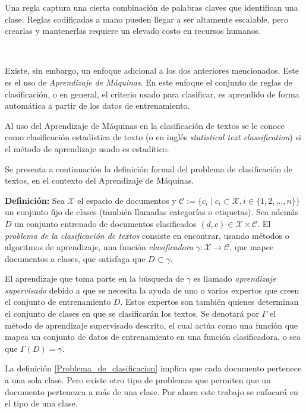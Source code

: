 \documentclass[t,compress,10pt,xcolor=dvipsnames]{beamer}
\begin{document}
{		Una regla captura una cierta combinaci\'on de palabras claves que identifican una clase. Reglas codificadas a mano pueden llegar a ser altamente escalable, pero crearlas y mantenerlas requiere un elevado costo en recursos humanos.
		
		\framebreak
		\textcolor{white}{.}
		
		Existe, sin embargo, un enfoque adicional a los dos anteriores mencionados. Este es el uso de \emph{Aprendizaje de M\'aquinas}. En este enfoque el conjunto de reglas de clasificaci\'on, o en general, el criterio usado para clasificar, es aprendido de forma autom\'atica a partir de los datos de entrenamiento.
		
		Al uso del Aprendizaje de M\'aquinas en la clasificaci\'on de textos se le conoce como clasificaci\'on estad\'istica de texto (o en ingl\'es \emph{statistical text classification}) si el m\'etodo de aprendizaje usado es estad\'itico.
		
		\framebreak
		
		Se presenta a continuaci\'on la definici\'on formal del problema de clasificaci\'on de textos, en el contexto del Aprendizaje de M\'aquinas.
		
		\vspace{.5em}
		
		\textbf{Definici\'on:}
			Sea $\mathcal{{X}}$ el espacio de documentos y $\mathcal{C} := \{c_i \mid c_i \subset \mathcal{X}, i \in \{ 1,2,\dots,n\} \}$ un conjunto fijo de clases (tambi\'en llamadas categor\'ias o etiquetas). Sea adem\'as $D$ un conjunto entrenado de documentos clasificados $(d,c) \in \mathcal X \times \mathcal{C}$. El \emph{problema de la clasificaci\'on de textos} consiste en encontrar, usando m\'etodos o algoritmos de aprendizaje, una funci\'on \emph{clasificadora} $\gamma : \mathcal{X} \rightarrow \mathcal{C}$, que mapee documentos a clases, que satisfaga que $D \subset \gamma$. 	
		
		\framebreak
		
		El aprendizaje que toma parte en la b\'usqueda de $\gamma$ es llamado \emph{aprendizaje supervisado} debido a que se necesita la ayuda de uno o varios expertos que creen el conjunto de entrenamiento $D$. Estos expertos son  tambi\'en quienes determinan el conjunto de clases en que se clasificar\'an los textos. Se denotar\'a  por $\Gamma$ el m\'etodo de aprendizaje supervisado descrito, el cual act\'ua como una funci\'on que mapea un conjunto de datos de entrenamiento en una funci\'on clasificadora, o sea que $\Gamma(D) = \gamma$.
		
		La definici\'on \ref{Problema_de_clasificacion} implica que cada documento pertenece a una sola clase. Pero existe otro tipo de problemas que permiten que un documento pertenezca a m\'as de una clase. Por ahora este trabajo se enfocar\'a en el tipo de una clase.
		
	
	}
	
\end{document}
